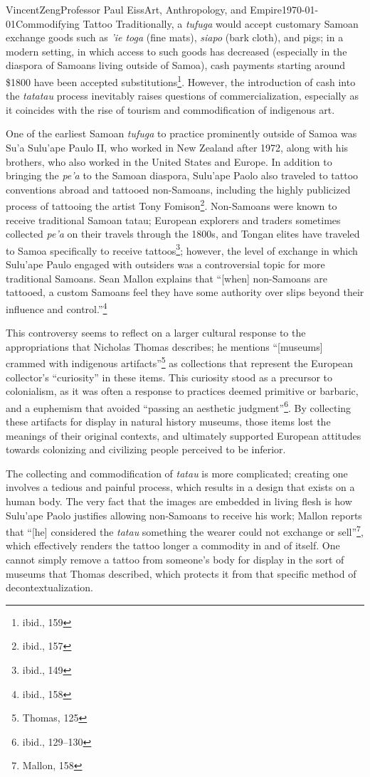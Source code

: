 \documentclass[12pt]{article}
\begin{document}
\begin{mla}{Vincent}{Zeng}{Professor Paul Eiss}{Art, Anthropology, and
  Empire}{\today}{Commodifying Tattoo}
Traditionally, a \textit{tufuga} would accept customary Samoan exchange goods
such as \textit{'ie toga} (fine mats), \textit{siapo} (bark cloth), and pigs; in
a modern setting, in which access to such goods has decreased (especially in the
diaspora of Samoans living outside of Samoa), cash payments starting around
\$1800 have been accepted substitutions\footnote{ibid., 159}. However, the
introduction of cash into the \textit{tatatau} process inevitably raises
questions of commercialization, especially as it coincides with the rise of
tourism and commodification of indigenous art.

One of the earliest Samoan \textit{tufuga} to practice prominently outside of
Samoa was Su'a Sulu'ape Paulo II, who worked in New Zealand after 1972, along
with his brothers, who also worked in the United States and Europe. In addition
to bringing the \textit{pe'a} to the Samoan diaspora, Sulu'ape Paolo also
traveled to tattoo conventions abroad and tattooed non-Samoans, including the
highly publicized process of tattooing the artist Tony Fomison\footnote{ibid.,
157}.  Non-Samoans were known to receive traditional Samoan tatau; European
explorers and traders sometimes collected \textit{pe'a} on their travels through
the 1800s, and Tongan elites have traveled to Samoa specifically to receive
tattoos\footnote{ibid., 149}; however, the level of exchange in which Sulu'ape
Paulo engaged with outsiders was a controversial topic for more traditional
Samoans. Sean Mallon explains that ``[when] non-Samoans are tattooed, a custom
Samoans feel they have some authority over slips beyond their influence and
control.''\footnote{ibid., 158}

This controversy seems to reflect on a larger cultural response to the
appropriations that Nicholas Thomas describes; he mentions ``[museums] crammed
with indigenous artifacts''\footnote{Thomas, 125} as collections that represent
the European collector's ``curiosity'' in these items. This curiosity stood as a
precursor to colonialism, as it was often a response to practices deemed
primitive or barbaric, and a euphemism that avoided ``passing an aesthetic
judgment''\footnote{ibid., 129–130}. By collecting these artifacts for display
in natural history museums, those items lost the meanings of their original
contexts, and ultimately supported European attitudes towards colonizing and
civilizing people perceived to be inferior.

The collecting and commodification of \textit{tatau} is more complicated;
creating one involves a tedious and painful process, which results in a design
that exists on a human body. The very fact that the images are embedded in
living flesh is how Sulu'ape Paolo justifies allowing non-Samoans to receive his
work; Mallon reports that ``[he] considered the \textit{tatau} something the
wearer could not exchange or sell''\footnote{Mallon, 158}, which effectively
renders the tattoo longer a commodity in and of itself. One cannot simply remove
a tattoo from someone's body for display in the sort of museums that Thomas
described, which protects it from that specific method of decontextualization.


\end{mla}
\end{document}
